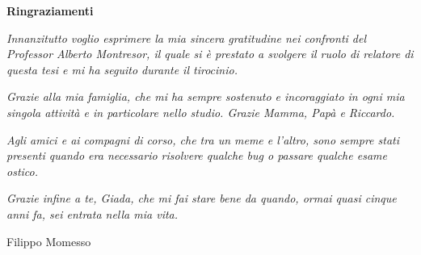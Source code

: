 \thispagestyle{empty}

\begin{center}
  {\bf \Huge Ringraziamenti}
\end{center}

\vspace{4cm}

\textit{
  Innanzitutto voglio esprimere la mia sincera gratitudine nei confronti del Professor Alberto Montresor, il quale si è prestato a svolgere il ruolo di relatore di questa tesi e mi ha seguito durante il tirocinio.}

\textit{
  Grazie alla mia famiglia, che mi ha sempre sostenuto e incoraggiato in ogni mia singola attività e in particolare nello studio. Grazie Mamma, Papà e Riccardo.}


\textit{  
  Agli amici e ai compagni di corso, che tra un meme e l'altro, sono sempre stati presenti quando era necessario risolvere qualche bug o passare qualche esame ostico.}

\textit{  
  Grazie infine a te, Giada, che mi fai stare bene da quando, ormai quasi cinque anni fa, sei entrata nella mia vita.
}
\vspace{2 cm} 
\begin{flushright}
  Filippo Momesso
\end{flushright} 

